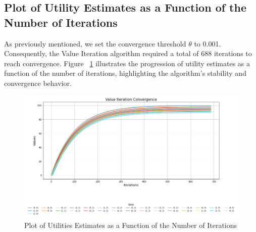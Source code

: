 \subsection{Plot of Utility Estimates as a Function of the Number of Iterations}
As previously mentioned, we set the convergence threshold $\theta$ to 0.001. Consequently, the Value Iteration algorithm required a total of 688 iterations to reach convergence. Figure ~\ref{fig:vi_plot_utility_est} illustrates the progression of utility estimates as a function of the number of iterations, highlighting the algorithm's stability and convergence behavior.

\begin{figure}[H]
    \centering
    \includegraphics[width=1.0\textwidth]{images/vi_plot_utility_est.png}
    \caption{Plot of Utilities Estimates as a Function of the Number of Iterations}
    \label{fig:vi_plot_utility_est}
\end{figure}
